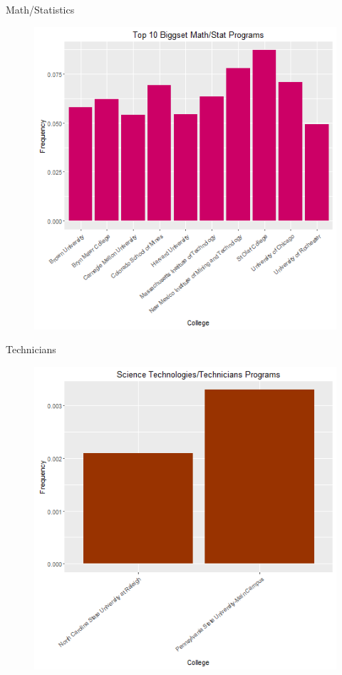\documentclass{article}
\begin{document}
Math/Statistics
\begin{figure}[h!]
\includegraphics{../images/biggestMathStat.png}
\end{figure}


Technicians
\begin{figure}[h!]
\includegraphics{../images/biggestTechnicians.png}
\end{figure}
\end{document}
